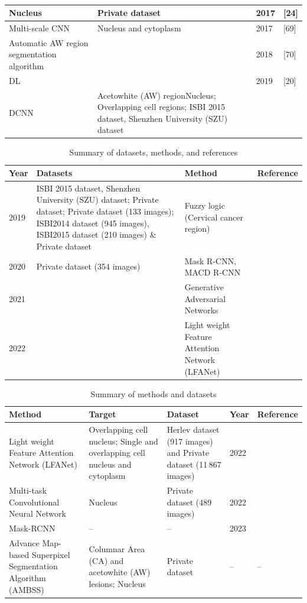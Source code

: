 \documentclass{svjour3}
\begin{document}
\begin{table}[htbp]
\centering
\caption{}
\label{tab:}
\begin{tabular}{|l|l|l|l|}
\hline
Nucleus & Private dataset & 2017 & [24] \\
\hline
Multi-scale CNN & Nucleus and cytoplasm & 2017 & [69] \\
\hline
Automatic AW region segmentation algorithm & & 2018 & [70] \\
\hline
DL & & 2019 & [20] \\
\hline
DCNN & Acetowhite (AW) regionNucleus; Overlapping cell regions; ISBI 2015 dataset, Shenzhen University (SZU) dataset & & \\
\hline
\end{tabular}
\end{table}

\begin{table}[htbp]
\centering
\caption{Summary of datasets, methods, and references}
\label{tab:summary}
\begin{tabular}{p{2.5cm} p{6cm} p{4cm} p{2cm}}
\hline
Year & Datasets & Method & Reference \\
\hline
2019 & ISBI 2015 dataset, Shenzhen University (SZU) dataset; Private dataset; Private dataset (133 images); ISBI2014 dataset (945 images), ISBI2015 dataset (210 images) \& Private dataset & Fuzzy logic (Cervical cancer region) & \cite{ref71} \\
\hline
2020 & Private dataset (354 images) & Mask R-CNN, MACD R-CNN & \cite{ref72,ref66} \\
\hline
2021 & & Generative Adversarial Networks & \cite{ref73} \\
\hline
2022 & & Light weight Feature Attention Network (LFANet) & \cite{ref74} \\
\hline
\end{tabular}
\end{table}

\begin{table}[htbp]
\centering
\caption{Summary of methods and datasets}
\label{tab:methods}
\begin{tabular}{p{4cm} p{4cm} p{4cm} p{2cm} p{2cm}}
\hline
Method & Target & Dataset & Year & Reference \\
\hline
Light weight Feature Attention Network (LFANet) & Overlapping cell nucleus; Single and overlapping cell nucleus and cytoplasm & Herlev dataset (917 images) and Private dataset (11\,867 images) & 2022 & \cite{ref40} \\
\hline
Multi-task Convolutional Neural Network & Nucleus & Private dataset (489 images) & 2022 & \cite{ref65} \\
\hline
Mask-RCNN & – & – & 2023 & \cite{ref75} \\
\hline
Advance Map-based Superpixel Segmentation Algorithm (AMBSS) & Columnar Area (CA) and acetowhite (AW) lesions; Nucleus & Private dataset & – & – \\
\hline
\end{tabular}
\end{table}
\end{document}
